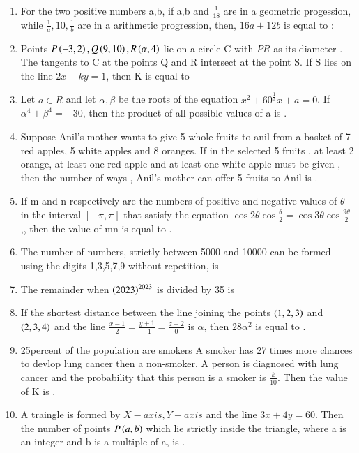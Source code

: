 \documentclass[journal]{IEEEtran}
\begin{document}
\begin{enumerate}
    \item For the two positive numbers a,b, if a,b and $\frac{1}{18}$ are in a geometric progession, while $\frac{1}{a},10,\frac{1}{b}$ are in a arithmetic progression, then, $16a+12b$ is equal to :
    \item Points $P\left(-3,2\right),Q\left(9,10\right),R\left(\alpha,4\right)$ lie on a circle C with $PR$ as its diameter . The tangents to C at the points Q and R intersect at the point S. If S lies on the line $2x-ky=1$, then K is equal to 
    \item Let $a\in R$ and let $\alpha,\beta$ be the roots of the equation $x^2+60^{\frac{1}{4}}x+a=0$. If $\alpha^4 +\beta^4=-30$, then the product of all possible values of a is .
\\
    \item Suppose Anil's mother wants to give 5 whole fruits to anil from a basket of 7 red apples, 5 white apples and 8 oranges. If in the selected 5 fruits , at least 2 orange, at least one red apple and at least one white apple must be given , then the number of ways , Anil's  mother can offer 5 fruits to Anil is   .\\
    \item If m and n respectively are the numbers of positive and negative values of $\theta$ in the interval $[-\pi,\pi]$ that satisfy the equation $\cos 2\theta \cos{\frac{\theta}{2}}=\cos 3\theta \cos{\frac{9\theta}{2}}$ \\,, then the value of mn is equal to .

    \item The number of numbers, strictly between 5000 and 10000 can be formed using the digits 1,3,5,7,9 without repetition, is \\
    \item The remainder when $\left(2023\right)^{2023}$ is divided by 35 is \\

    \item If the shortest distance between the line joining the points $\left(1,2,3\right)$ and $\left(2,3,4\right)$ and the line $\frac{x-1}{2}=\frac{y+1}{-1}=\frac{z-2}{0}$ is $\alpha$, then $28\alpha^2$ is equal to . \\
    \item 25percent of the population are smokers A smoker has 27 times more chances to devlop lung cancer then a non-smoker. A person is diagnosed with lung cancer and the probability that this person is a smoker is $\frac{k}{10}.$ Then the value of K is .\\
    \item A traingle is formed by $X-axis,Y-axis$ and the line $3x+4y=60$. Then the number of points $P\left(a,b\right)$  which lie strictly inside  the triangle, where a is an integer and b is a multiple of a, is .

 \end{enumerate}
\end{document}
